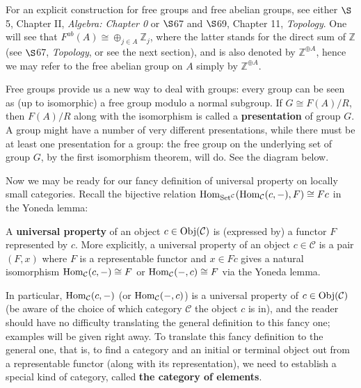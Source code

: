 \begin{example}
\begin{enumerate}[label=(\roman*)]
	\end{enumerate}
	For an explicit construction for free groups and free abelian groups, see either $\S$5, Chapter II, \textsl{Algebra: Chapter 0} or $\S$67 and $\S$69, Chapter 11, \textsl{Topology}. One will see that $F^{ab}(A)\cong \oplus_{j\in A}\mathbb{Z}_j$, where the latter stands for the direct sum of $\mathbb{Z}$ (see $\S$67, \textsl{Topology}, or see the next section), and is also denoted by $\mathbb{Z}^{\oplus A}$, hence we may refer to the free abelian group on $A$ simply by $\mathbb{Z}^{\oplus A}$.
\end{example}

\begin{remark}
Free groups provide us a new way to deal with groups: every group can be seen as (up to isomorphic) a free group modulo a normal subgroup. If $G\cong F(A)/R$, then $F(A)/R$ along with the isomorphism is called a \textbf{presentation} of group $G$. A group might have a number of very different presentations, while there must be at least one presentation for a group: the free group on the underlying set of group $G$, by the first isomorphism theorem, will do. See the diagram below.
\begin{center}
\end{center}
\end{remark}
Now we may be ready for our fancy definition of universal property on locally small categories. Recall the bijective relation $\operatorname{Hom}_{\mathrm{Set}^{\mathcal{C}}}(\operatorname{Hom}_\mathcal{C}(c,-),F)\cong Fc$ in the Yoneda lemma:
\begin{definition}
	A \textbf{universal property} of an object $c\in \operatorname{Obj}(\mathcal{C})$ is (expressed by) a functor $F$ represented by $c$. More explicitly, a universal property of an object $c\in \mathcal{C}$ is a pair $(F,x)$ where $F$ is a  representable functor and $x\in Fc$ gives a natural isomorphism $\operatorname{Hom}_\mathcal{C}(c,-)\cong F$ or $\operatorname{Hom}_\mathcal{C}(-,c)\cong F$ via the Yoneda lemma.
\end{definition}
In particular, $\operatorname{Hom}_\mathcal{C}(c,-)$ (or $\operatorname{Hom}_\mathcal{C}(-,c)$) is a universal property of $c\in \operatorname{Obj}(\mathcal{C})$ (be aware of the choice of which category $\mathcal{C}$ the object $c$ is in), and the reader should have no difficulty translating the general definition to this fancy one; examples will be given right away. To translate this fancy definition to the general one, that is, to find a category and an initial or terminal object out from a representable functor (along with its representation), we need to establish a special kind of category, called \textbf{the category of elements}. 
